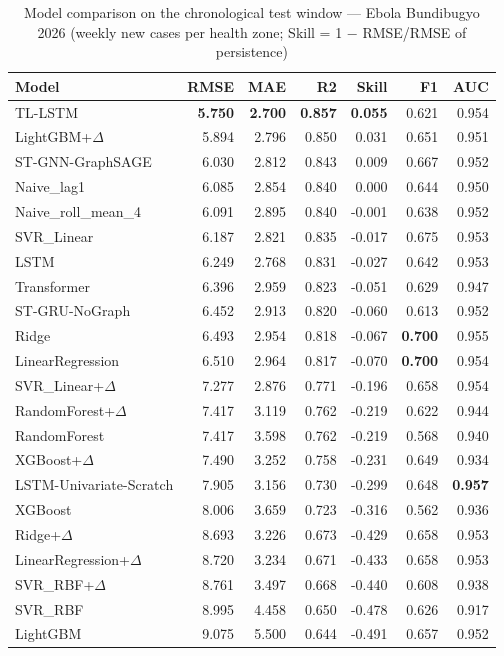 \begin{table}[htbp]
\centering
\caption{Model comparison on the chronological test window --- Ebola Bundibugyo 2026 (weekly new cases per health zone; Skill = 1 $-$ RMSE/RMSE of persistence)}
\label{tab:model_comparison}
\begin{tabular}{lrrrrrr}
\toprule
\textbf{Model} & \textbf{RMSE} & \textbf{MAE} & \textbf{R2} & \textbf{Skill} & \textbf{F1} & \textbf{AUC} \\
\midrule
TL-LSTM & \textbf{5.750} & \textbf{2.700} & \textbf{0.857} & \textbf{0.055} & 0.621 & 0.954 \\
LightGBM+$\Delta$ & 5.894 & 2.796 & 0.850 & 0.031 & 0.651 & 0.951 \\
ST-GNN-GraphSAGE & 6.030 & 2.812 & 0.843 & 0.009 & 0.667 & 0.952 \\
Naive\_lag1 & 6.085 & 2.854 & 0.840 & 0.000 & 0.644 & 0.950 \\
Naive\_roll\_mean\_4 & 6.091 & 2.895 & 0.840 & -0.001 & 0.638 & 0.952 \\
SVR\_Linear & 6.187 & 2.821 & 0.835 & -0.017 & 0.675 & 0.953 \\
LSTM & 6.249 & 2.768 & 0.831 & -0.027 & 0.642 & 0.953 \\
Transformer & 6.396 & 2.959 & 0.823 & -0.051 & 0.629 & 0.947 \\
ST-GRU-NoGraph & 6.452 & 2.913 & 0.820 & -0.060 & 0.613 & 0.952 \\
Ridge & 6.493 & 2.954 & 0.818 & -0.067 & \textbf{0.700} & 0.955 \\
LinearRegression & 6.510 & 2.964 & 0.817 & -0.070 & \textbf{0.700} & 0.954 \\
SVR\_Linear+$\Delta$ & 7.277 & 2.876 & 0.771 & -0.196 & 0.658 & 0.954 \\
RandomForest+$\Delta$ & 7.417 & 3.119 & 0.762 & -0.219 & 0.622 & 0.944 \\
RandomForest & 7.417 & 3.598 & 0.762 & -0.219 & 0.568 & 0.940 \\
XGBoost+$\Delta$ & 7.490 & 3.252 & 0.758 & -0.231 & 0.649 & 0.934 \\
LSTM-Univariate-Scratch & 7.905 & 3.156 & 0.730 & -0.299 & 0.648 & \textbf{0.957} \\
XGBoost & 8.006 & 3.659 & 0.723 & -0.316 & 0.562 & 0.936 \\
Ridge+$\Delta$ & 8.693 & 3.226 & 0.673 & -0.429 & 0.658 & 0.953 \\
LinearRegression+$\Delta$ & 8.720 & 3.234 & 0.671 & -0.433 & 0.658 & 0.953 \\
SVR\_RBF+$\Delta$ & 8.761 & 3.497 & 0.668 & -0.440 & 0.608 & 0.938 \\
SVR\_RBF & 8.995 & 4.458 & 0.650 & -0.478 & 0.626 & 0.917 \\
LightGBM & 9.075 & 5.500 & 0.644 & -0.491 & 0.657 & 0.952 \\
\bottomrule
\end{tabular}
\end{table}